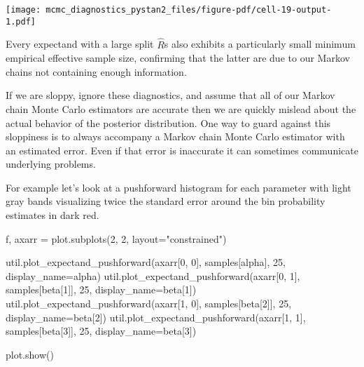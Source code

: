\documentclass[
  letterpaper,
  DIV=11,
  numbers=noendperiod]{scrartcl}
\newenvironment{Shaded}{\begin{snugshade}}{\end{snugshade}}
\newcommand{\DecValTok}[1]{\textcolor[rgb]{0.68,0.00,0.00}{#1}}
\newcommand{\NormalTok}[1]{\textcolor[rgb]{0.00,0.23,0.31}{#1}}
\newcommand{\OperatorTok}[1]{\textcolor[rgb]{0.37,0.37,0.37}{#1}}
\newcommand{\StringTok}[1]{\textcolor[rgb]{0.13,0.47,0.30}{#1}}
\begin{document}
\texttt{[image: mcmc\_diagnostics\_pystan2\_files/figure-pdf/cell-19-output-1.pdf]}

Every expectand with a large split \(\hat{R}\)s also exhibits a
particularly small minimum empirical effective sample size, confirming
that the latter are due to our Markov chains not containing enough
information.

If we are sloppy, ignore these diagnostics, and assume that all of our
Markov chain Monte Carlo estimators are accurate then we are quickly
mislead about the actual behavior of the posterior distribution. One way
to guard against this sloppiness is to always accompany a Markov chain
Monte Carlo estimator with an estimated error. Even if that error is
inaccurate it can sometimes communicate underlying problems.

For example let's look at a pushforward histogram for each parameter
with light gray bands visualizing twice the standard error around the
bin probability estimates in dark red.

\begin{Shaded}
\begin{Highlighting}[]
\NormalTok{f, axarr }\OperatorTok{=}\NormalTok{ plot.subplots(}\DecValTok{2}\NormalTok{, }\DecValTok{2}\NormalTok{, layout}\OperatorTok{=}\StringTok{"constrained"}\NormalTok{)}

\NormalTok{util.plot\_expectand\_pushforward(axarr[}\DecValTok{0}\NormalTok{, }\DecValTok{0}\NormalTok{], samples[}\StringTok{\textquotesingle{}alpha\textquotesingle{}}\NormalTok{], }
                                \DecValTok{25}\NormalTok{, display\_name}\OperatorTok{=}\StringTok{\textquotesingle{}alpha\textquotesingle{}}\NormalTok{)}
\NormalTok{util.plot\_expectand\_pushforward(axarr[}\DecValTok{0}\NormalTok{, }\DecValTok{1}\NormalTok{], samples[}\StringTok{\textquotesingle{}beta[1]\textquotesingle{}}\NormalTok{], }
                                \DecValTok{25}\NormalTok{, display\_name}\OperatorTok{=}\StringTok{\textquotesingle{}beta[1]\textquotesingle{}}\NormalTok{)}
\NormalTok{util.plot\_expectand\_pushforward(axarr[}\DecValTok{1}\NormalTok{, }\DecValTok{0}\NormalTok{], samples[}\StringTok{\textquotesingle{}beta[2]\textquotesingle{}}\NormalTok{], }
                                \DecValTok{25}\NormalTok{, display\_name}\OperatorTok{=}\StringTok{\textquotesingle{}beta[2]\textquotesingle{}}\NormalTok{)}
\NormalTok{util.plot\_expectand\_pushforward(axarr[}\DecValTok{1}\NormalTok{, }\DecValTok{1}\NormalTok{], samples[}\StringTok{\textquotesingle{}beta[3]\textquotesingle{}}\NormalTok{], }
                                \DecValTok{25}\NormalTok{, display\_name}\OperatorTok{=}\StringTok{\textquotesingle{}beta[3]\textquotesingle{}}\NormalTok{)}

\NormalTok{plot.show()}
\end{Highlighting}
\end{Shaded}
\end{document}
